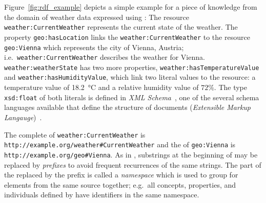 Figure~\ref{fig:rdf_example} depicts a simple example for a piece of knowledge from the domain of weather data expressed using : The resource \texttt{weather:\hspace{0pt}Current\hspace{0pt}Weather} represents the current state of the weather. The property \texttt{geo:\hspace{0pt}has\hspace{0pt}Location} links the \texttt{weather:\hspace{0pt}Current\hspace{0pt}Weather} to the resource \texttt{geo:\hspace{0pt}Vienna} which represents the city of Vienna, Austria; i.e.\ \texttt{weather:\hspace{0pt}Current\hspace{0pt}Weather} describes the weather for Vienna. \texttt{weather:\hspace{0pt}weather\hspace{0pt}State} has two more properties, \texttt{weather:\hspace{0pt}has\hspace{0pt}Temperature\hspace{0pt}Value} and \texttt{weather:\hspace{0pt}has\hspace{0pt}Humidity\hspace{0pt}Value}, which link two literal values to the resource: a temperature value of \SI{18.2}{\celsius} and a relative humidity value of $72 \%$.
The type \texttt{xsd:\hspace{0pt}float} of both literals is defined in \emph{XML Schema}~\cite{xml-schema,xml-schema-datatypes}, one of the several  schema languages available that define the structure of  documents (\emph{Extensible Markup Langauge})~\cite{XML}.

The complete  of \texttt{weather:\hspace{0pt}Current\hspace{0pt}Weather} is \texttt{http://example.org/\hspace{0pt}weather\#\hspace{0pt}CurrentWeather} and the  of \texttt{geo:\hspace{0pt}Vienna} is \texttt{http://example.org/geo\#Vienna}. As in , substrings at the beginning of  may be replaced by \emph{prefixes} to avoid frequent recurrences of the same strings. The part of the  replaced by the prefix is called a \emph{namespace} which is used to group  for elements from the same source together; e.g.\ all concepts, properties, and individuals defined by \smarthomeweather have identifiers in the same namespace.

